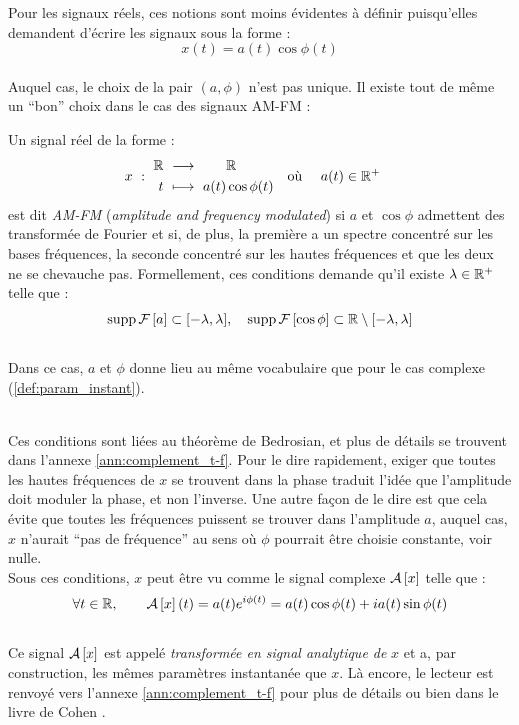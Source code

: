 Pour les signaux réels, ces notions sont moins évidentes à définir puisqu'elles demandent d'écrire les signaux sous la forme :
\[x(t) = a(t) \cos\phi(t)\]
\\
Auquel cas, le choix de la pair $(a,\phi)$ n'est pas unique. Il existe tout de même un ``bon'' choix dans le cas des signaux AM-FM :
\begin{definition}[Signal AM-FM]
	Un signal réel de la forme :
	\begin{align}
		x\ &:\ \begin{aligned}\mathbb{R}\ &\longrightarrow\qquad \mathbb{R} \\
			t\ &\longmapsto\ a(t) \cos\phi(t)
		\end{aligned}  &  \text{où }\quad a(t)\in\mathbb{R}^+\quad
	\end{align}
	est dit \emph{AM-FM} (\emph{amplitude and frequency modulated}) si $a$ et $\cos\phi$ admettent des transformée de Fourier et si, de plus, la première a un spectre concentré sur les bases fréquences, la seconde concentré sur les hautes fréquences et que les deux ne se chevauche pas.
	Formellement, ces conditions demande qu'il existe $\lambda\in\mathbb{R}^+$ telle que :
	\begin{equation}\label{eq:condi_AM-FM}
		\text{\normalfont supp}\, \mathcal{F}\left[a\right] \subset [-\lambda, \lambda],\quad \text{\normalfont supp}\, \mathcal{F}\left[\cos\phi\right] \subset \mathbb{R}\setminus[-\lambda,\lambda]
	\end{equation}
	\\
	Dans ce cas, $a$ et $\phi$ donne lieu au même vocabulaire que pour le cas complexe (\cref{def:param_instant}).
\end{definition}
\skipl
\\
Ces conditions sont liées au théorème de Bedrosian, et plus de détails se trouvent dans l'annexe \ref{ann:complement_t-f}. Pour le dire rapidement, exiger que toutes les hautes fréquences de $x$ se trouvent dans la phase traduit l'idée que l'amplitude doit moduler la phase, et non l'inverse. Une autre façon de le dire est que cela évite que toutes les fréquences puissent se trouver dans l'amplitude $a$, auquel cas, $x$ n'aurait ``pas de fréquence'' au sens où $\phi$ pourrait être choisie constante, voir nulle.
\\
Sous ces conditions, $x$ peut être vu comme le signal complexe $\mathcal{A}\left[x\right]$ telle que :
\begin{equation}
	\forall t\in\mathbb{R},\qquad \mathcal{A}\left[x\right](t) = a(t) e^{i\phi(t)}= a(t)\cos\phi(t) + ia(t)\sin\phi(t)
\end{equation}
\\
Ce signal $\mathcal{A}\left[x\right]$ est appelé \emph{transformée en signal analytique de} $x$ et a, par construction, les mêmes paramètres instantanée que $x$.
Là encore, le lecteur est renvoyé vers l'annexe \ref{ann:complement_t-f} pour plus de détails ou bien dans le livre de Cohen \cite{cohen_time_1995}.
\\

